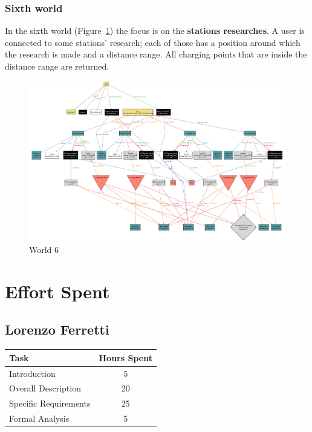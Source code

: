 \documentclass{Configuration_Files/PoliMi3i_thesis}
\begin{document}
\subsection{Sixth world}

In the sixth world (Figure~\ref{fig:world6}) the focus is on the \textbf{stations researches}. A user is connected to some stations' research; each of those has a position around which the research is made and a distance range. All charging points that are inside the distance range are returned.

\begin{figure}[H]
    \centering
    \includegraphics[width=1\textwidth]{Images/alloy/world6.png}
    \caption{World 6}
    \label{fig:world6}
\end{figure}

\chapter{Effort Spent}

\section{Lorenzo Ferretti}

\begin{table}[H]
    \centering 
    \begin{tabular}{|l|c|}
    \hline
    \rowcolor{bluepoli!40}
    \textbf{Task} & \textbf{Hours Spent} \T\B \\
    \hline
    Introduction & 5 \T\B \\
    \hline
    Overall Description & 20 \T\B \\
    \hline
    Specific Requirements & 25\T\B \\
    \hline
    Formal Analysis & 5 \T\B \\
    \hline
    \end{tabular}
\end{table}
\end{document}
